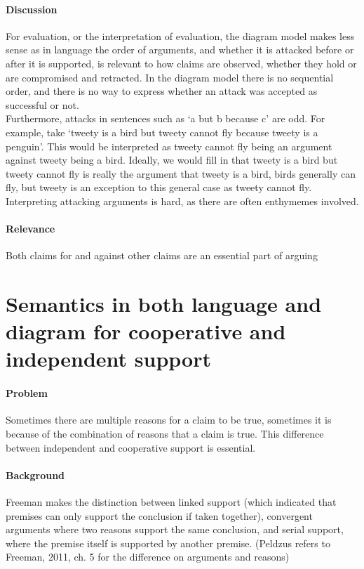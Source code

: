 \documentclass{article}
\let\stdsection\section
\renewcommand\section{\newpage\stdsection}
\begin{document}
\paragraph{Discussion} For evaluation, or the interpretation of evaluation, the diagram model makes less sense as in language the order of arguments, and whether it is attacked before or after it is supported, is relevant to how claims are observed, whether they hold or are compromised and retracted. In the diagram model there is no sequential order, and there is no way to express whether an attack was accepted as successful or not.\\
Furthermore, attacks in sentences such as `a but b because c' are odd. For example, take `tweety is a bird but tweety cannot fly because tweety is a penguin'. This would be interpreted as tweety cannot fly being an argument against tweety being a bird. Ideally, we would fill in that tweety is a bird but tweety cannot fly is really the argument that tweety is a bird, birds generally can fly, but tweety is an exception to this general case as tweety cannot fly. Interpreting attacking arguments is hard, as there are often enthymemes involved.
\paragraph{Relevance} Both claims for and against other claims are an essential part of arguing


\section{Semantics in both language and diagram for cooperative and independent support}

\paragraph{Problem} Sometimes there are multiple reasons for a claim to be true, sometimes it is because of the combination of reasons that a claim is true. This difference between independent and cooperative support is essential.
\paragraph{Background} Freeman makes the distinction between linked support (which indicated that premises can only support the conclusion if taken together), convergent arguments where two reasons support the same conclusion, and serial support, where the premise itself is supported by another premise. (Peldzus refers to Freeman, 2011, ch. 5 for the difference on arguments and reasons)
\end{document}
